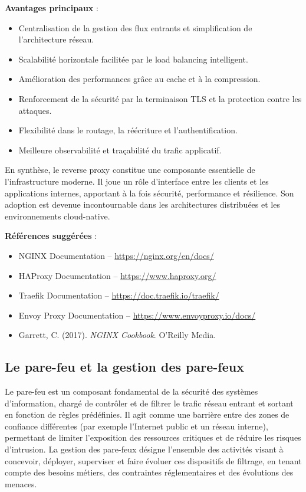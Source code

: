 \textbf{Avantages principaux} :
\begin{itemize}
	\item Centralisation de la gestion des flux entrants et simplification de l’architecture réseau.
	\item Scalabilité horizontale facilitée par le load balancing intelligent.
	\item Amélioration des performances grâce au cache et à la compression.
	\item Renforcement de la sécurité par la terminaison TLS et la protection contre les attaques.
	\item Flexibilité dans le routage, la réécriture et l’authentification.
	\item Meilleure observabilité et traçabilité du trafic applicatif.
\end{itemize}

En synthèse, le reverse proxy constitue une composante essentielle de l’infrastructure moderne. Il joue un rôle d’interface entre les clients et les applications internes, apportant à la fois sécurité, performance et résilience. Son adoption est devenue incontournable dans les architectures distribuées et les environnements cloud-native.

\textbf{Références suggérées} :
\begin{itemize}
	\item NGINX Documentation – \url{https://nginx.org/en/docs/}
	\item HAProxy Documentation – \url{https://www.haproxy.org/}
	\item Traefik Documentation – \url{https://doc.traefik.io/traefik/}
	\item Envoy Proxy Documentation – \url{https://www.envoyproxy.io/docs/}
	\item Garrett, C. (2017). \textit{NGINX Cookbook}. O’Reilly Media.
\end{itemize}

\subsection{Le pare-feu et la gestion des pare-feux}

Le pare-feu est un composant fondamental de la sécurité des systèmes d’information, chargé de contrôler et de filtrer le trafic réseau entrant et sortant en fonction de règles prédéfinies. Il agit comme une barrière entre des zones de confiance différentes (par exemple l’Internet public et un réseau interne), permettant de limiter l’exposition des ressources critiques et de réduire les risques d’intrusion. La gestion des pare-feux désigne l’ensemble des activités visant à concevoir, déployer, superviser et faire évoluer ces dispositifs de filtrage, en tenant compte des besoins métiers, des contraintes réglementaires et des évolutions des menaces.

